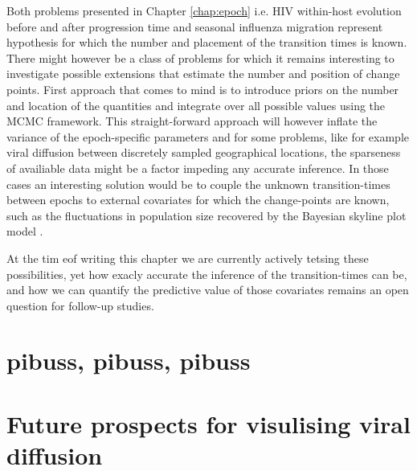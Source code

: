 Both problems presented in Chapter \ref{chap:epoch} i.e. HIV within-host evolution before and after progression time and seasonal influenza migration represent hypothesis for which the number and placement of the transition times is known.
There might however be a class of problems for which it remains interesting to investigate possible extensions that estimate the number and position of change points.
First approach that comes to mind is to introduce priors on the number and location of the quantities and integrate over all possible values using the MCMC framework.
This straight-forward approach will however inflate the variance of the epoch-specific parameters and for some problems, 
like for example viral diffusion between discretely sampled geographical locations, the sparseness of availiable data might be a factor impeding any accurate inference.
In those cases an interesting solution would be to couple the unknown transition-times between epochs to external covariates for which the change-points are known, such as  the fluctuations in population size recovered by the Bayesian skyline plot model \citep{Drummond2005}.



At the tim eof writing this chapter we are currently actively tetsing these possibilities, yet how exacly accurate the inference of the transition-times can be, and how we can quantify the predictive value of those covariates remains an open question for follow-up studies.














\section{pibuss, pibuss, pibuss}



\section{Future prospects for visulising viral diffusion}
















